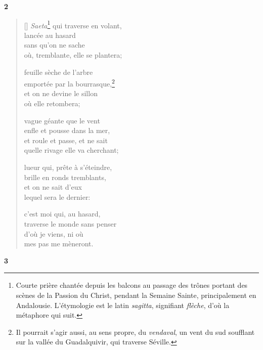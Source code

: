 \documentclass[a4paper,12pt]{book}
\begin{document}
\bigskip

\begin{center}
  \textbf{2}
\end{center}

\settowidth{\versewidth}{où, tremblante, elle se plantera;}

\begin{verse}[\versewidth]
  \emph{Saeta}\footnote{Courte prière chantée
  depuis les balcons au passage des trônes portant des scènes de la
  Passion du Christ, pendant la Semaine Sainte, principalement en
  Andalousie. L'étymologie est le latin \emph{sagitta},
  signifiant \emph{flèche}, d'où la métaphore qui suit.} qui traverse en volant, \\
  lancée au hasard \\
  sans qu'on ne sache \\
  où, tremblante, elle se plantera;

  feuille sèche de l'arbre \\
  emportée par la bourrasque,\footnote{Il pourrait s'agir aussi, au
  sens propre, du \emph{vendaval}, un vent du sud soufflant sur la
  vallée du Guadalquivir, qui traverse Séville.} \\
  et on ne devine le sillon \\
  où elle retombera;

  vague géante que le vent \\
  enfle et pousse dans la mer, \\
  et roule et passe, et ne sait \\
  quelle rivage elle va cherchant;

  lueur qui, prête à s'éteindre, \\
  brille en ronds tremblants, \\
  et on ne sait d'eux \\
  lequel sera le dernier:

  c'est moi qui, au hasard, \\
  traverse le monde sans penser \\
  d'où je viens, ni où \\
  mes pas me mèneront.
\end{verse}

\bigskip

\begin{center}
  \textbf{3}
\end{center}
\end{document}
